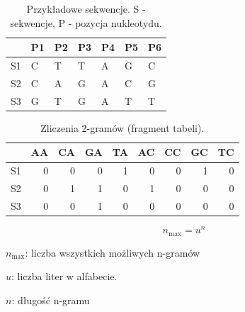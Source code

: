 \documentclass[10pt]{beamer}\usepackage[]{graphicx}\usepackage[]{color}
\begin{document}
\begin{frame}

\begin{table}[ht]
\centering
\begin{tabular}{rllllll}
  \hline
 & P1 & P2 & P3 & P4 & P5 & P6 \\ 
  \hline
S1 & C & T & T & A & G & C \\ 
  S2 & C & A & G & A & C & G \\ 
  S3 & G & T & G & A & T & T \\ 
   \hline
\end{tabular}
\caption{Przykładowe sekwencje.  S - sekwencje, P - pozycja nukleotydu.} 
\end{table}

  

  
\begin{table}[ht]
\centering
\begin{tabular}{rrrrrrrrr}
  \hline
 & AA & CA & GA & TA & AC & CC & GC & TC \\ 
  \hline
S1 & 0 & 0 & 0 & 1 & 0 & 0 & 1 & 0 \\ 
  S2 & 0 & 1 & 1 & 0 & 1 & 0 & 0 & 0 \\ 
  S3 & 0 & 0 & 1 & 0 & 0 & 0 & 0 & 0 \\ 
   \hline
\end{tabular}
\caption{Zliczenia 2-gramów (fragment tabeli).} 
\end{table}


\end{frame}

\begin{frame}
$$n_\text{max} = u^n$$

$n_\text{max}$: liczba wszystkich możliwych n-gramów

$u$: liczba liter w alfabecie.

$n$: długość n-gramu

\end{frame}
\end{document}
